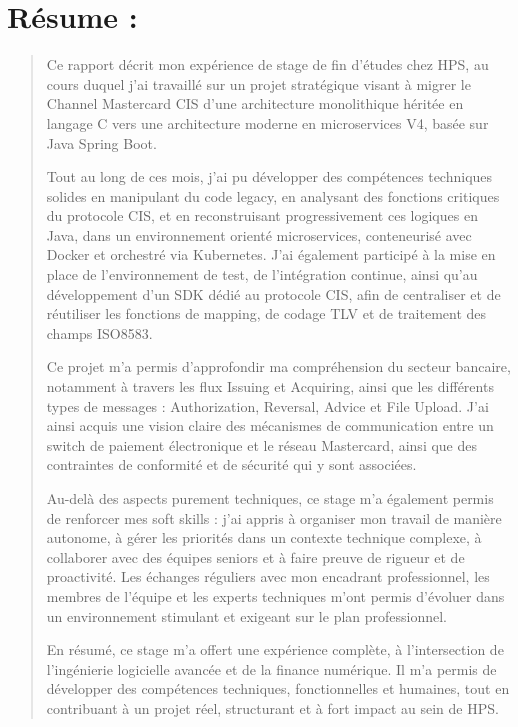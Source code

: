 \documentclass[12pt,a4paper]{report}
\begin{document}
\section{Résume :}
\begin{quote}
Ce rapport décrit mon expérience de stage de fin d'études chez HPS, au
cours duquel j'ai travaillé sur un projet stratégique visant à migrer le
Channel Mastercard CIS d'une architecture monolithique héritée en
langage C vers une architecture moderne en microservices V4, basée sur
Java Spring Boot.

Tout au long de ces mois, j'ai pu développer des compétences techniques
solides en manipulant du code legacy, en analysant des fonctions
critiques du protocole CIS, et en reconstruisant progressivement ces
logiques en Java, dans un environnement orienté microservices,
conteneurisé avec Docker et orchestré via Kubernetes. J'ai également
participé à la mise en place de l'environnement de test, de
l'intégration continue, ainsi qu'au développement d'un SDK dédié au
protocole CIS, afin de centraliser et de réutiliser les fonctions de
mapping, de codage TLV et de traitement des champs ISO8583.

Ce projet m'a permis d'approfondir ma compréhension du secteur bancaire,
notamment à travers les flux Issuing et Acquiring, ainsi que les
différents types de messages : Authorization, Reversal, Advice et File
Upload. J'ai ainsi acquis une vision claire des mécanismes de
communication entre un switch de paiement électronique et le réseau
Mastercard, ainsi que des contraintes de conformité et de sécurité qui y
sont associées.

Au-delà des aspects purement techniques, ce stage m'a également permis
de renforcer mes soft skills : j'ai appris à organiser mon travail de
manière autonome, à gérer les priorités dans un contexte technique
complexe, à collaborer avec des équipes seniors et à faire preuve de
rigueur et de proactivité. Les échanges réguliers avec mon encadrant
professionnel, les membres de l'équipe et les experts techniques m'ont
permis d'évoluer dans un environnement stimulant et exigeant sur le plan
professionnel.

En résumé, ce stage m'a offert une expérience complète, à l'intersection
de l'ingénierie logicielle avancée et de la finance numérique. Il m'a
permis de développer des compétences techniques, fonctionnelles et
humaines, tout en contribuant à un projet réel, structurant et à fort
impact au sein de HPS.
\end{quote}
\clearpage
\end{document}

